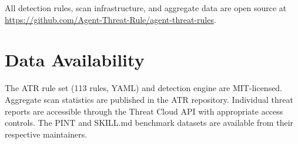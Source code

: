 \documentclass[letterpaper,twocolumn,10pt]{article}
\begin{document}
All detection rules, scan infrastructure, and aggregate data are open
source at \url{https://github.com/Agent-Threat-Rule/agent-threat-rules}.

\section*{Data Availability}

The ATR rule set (113 rules, YAML) and detection engine are MIT-licensed.
Aggregate scan statistics are published in the ATR repository.
Individual threat reports are accessible through the Threat Cloud API
with appropriate access controls.  The PINT and SKILL.md benchmark
datasets are available from their respective maintainers.


\end{document}

